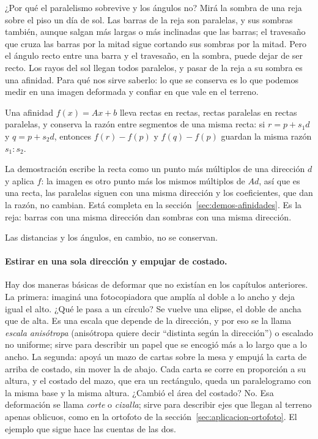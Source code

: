 ¿Por qué el paralelismo sobrevive y los ángulos no? Mirá la sombra de una reja sobre el piso
un día de sol. Las barras de la reja son paralelas, y sus sombras también, aunque salgan más
largas o más inclinadas que las barras; el travesaño que cruza las barras por la mitad sigue
cortando sus sombras por la mitad. Pero el ángulo recto entre una barra y el travesaño, en la
sombra, puede dejar de ser recto. Los rayos del sol llegan todos paralelos, y pasar de la reja
a su sombra es una afinidad. Para qué nos sirve saberlo: lo que se conserva es lo que podemos
medir en una imagen deformada y confiar en que vale en el terreno.

\begin{proposicion}\label{prop:06-conserva}
Una afinidad \(f(x)=Ax+b\) lleva rectas en rectas, rectas paralelas en rectas paralelas, y
conserva la razón entre segmentos de una misma recta: si \(r=p+s_1d\) y \(q=p+s_2d\), entonces
\(f(r)-f(p)\) y \(f(q)-f(p)\) guardan la misma razón \(s_1:s_2\).
\end{proposicion}

La demostración escribe la recta como un punto más múltiplos de una dirección \(d\) y aplica
\(f\): la imagen es otro punto más los mismos múltiplos de \(Ad\), así que es una recta, las
paralelas siguen con una misma dirección y los coeficientes, que dan la razón, no cambian. Está
completa en la sección~\ref{sec:demos-afinidades}. Es la reja: barras con una misma dirección dan sombras con
una misma dirección.

Las distancias y los ángulos, en cambio, no se conservan.

\paragraph{Estirar en una sola dirección y empujar de costado.}
Hay dos maneras básicas de deformar que no existían en los capítulos anteriores. La primera:
imaginá una fotocopiadora que amplía al doble a lo ancho y deja igual el alto. ¿Qué le pasa a
un círculo? Se vuelve una elipse, el doble de ancha que de alta. Es una escala que depende de
la dirección, y por eso se la llama \emph{escala anisótropa} (anisótropa quiere decir
\enquote{distinta según la dirección}) o escalado no uniforme; sirve para describir un papel
que se encogió más a lo largo que a lo ancho. La segunda: apoyá un mazo de cartas sobre la
mesa y empujá la carta de arriba de costado, sin mover la de abajo. Cada carta se corre en
proporción a su altura, y el costado del mazo, que era un rectángulo, queda un paralelogramo
con la misma base y la misma altura. ¿Cambió el área del costado? No. Esa deformación se
llama \emph{corte} o \emph{cizalla}; sirve para describir ejes que llegan al terreno apenas
oblicuos, como en la ortofoto de la sección~\ref{sec:aplicacion-ortofoto}. El ejemplo que
sigue hace las cuentas de las dos.

